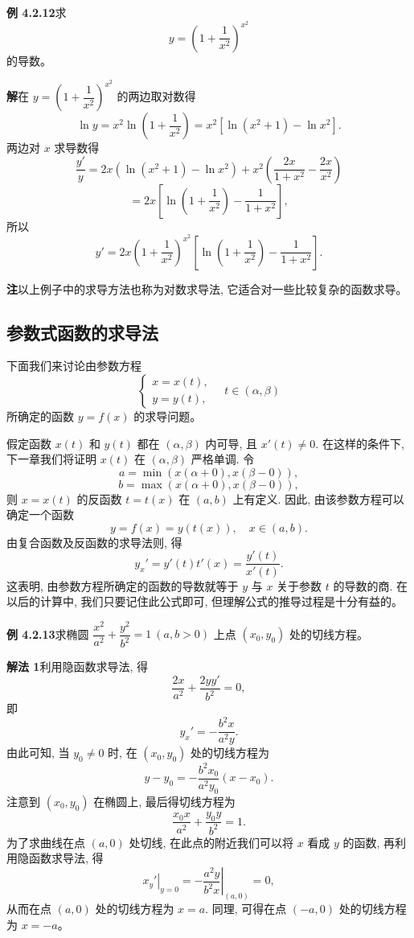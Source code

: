 \documentclass[UTF8, 12pt, fontset=fandol, oneside]{ctexart}
\begin{document}
\noindent\textbf{例 4.2.12}\quad 求
\[
  y=\left(1+\frac1{x^2}\right)^{x^2}
\]
的导数。

\noindent\textbf{解}\quad 在 $y=\left(1+\dfrac1{x^2}\right)^{x^2}$ 的两边取对数得
\[
  \ln y=x^2\ln\left(1+\frac1{x^2}\right)
  =
  x^2[\ln(x^2+1)-\ln x^2].
\]
两边对 $x$ 求导数得
\[
  \frac{y'}y
  =
  2x(\ln(x^2+1)-\ln x^2)
  +
  x^2\left(\frac{2x}{1+x^2}-\frac{2x}{x^2}\right)
\]
\[
  =
  2x\left[\ln\left(1+\frac1{x^2}\right)-\frac1{1+x^2}\right],
\]
所以
\[
  y'=2x\left(1+\frac1{x^2}\right)^{x^2}
  \left[\ln\left(1+\frac1{x^2}\right)-\frac1{1+x^2}\right].
\]

\noindent\textbf{注}\quad 以上例子中的求导方法也称为对数求导法, 它适合对一些比较复杂的函数求导。

\subsection{参数式函数的求导法}

下面我们来讨论由参数方程
\[
  \begin{cases}
    x=x(t),\\
    y=y(t),
  \end{cases}
  \quad t\in(\alpha,\beta)
\]
所确定的函数 $y=f(x)$ 的求导问题。

假定函数 $x(t)$ 和 $y(t)$ 都在 $(\alpha,\beta)$ 内可导, 且 $x'(t)\ne0$. 在这样的条件下, 下一章我们将证明 $x(t)$ 在 $(\alpha,\beta)$ 严格单调. 令
\[
  a=\min(x(\alpha+0),x(\beta-0)),
\]
\[
  b=\max(x(\alpha+0),x(\beta-0)),
\]
则 $x=x(t)$ 的反函数 $t=t(x)$ 在 $(a,b)$ 上有定义. 因此, 由该参数方程可以确定一个函数
\[
  y=f(x)=y(t(x)),\quad x\in(a,b).
\]
由复合函数及反函数的求导法则, 得
\[
  y_x'=y'(t)t'(x)=\frac{y'(t)}{x'(t)}.
\]
这表明, 由参数方程所确定的函数的导数就等于 $y$ 与 $x$ 关于参数 $t$ 的导数的商. 在以后的计算中, 我们只要记住此公式即可, 但理解公式的推导过程是十分有益的。

\noindent\textbf{例 4.2.13}\quad 求椭圆 $\dfrac{x^2}{a^2}+\dfrac{y^2}{b^2}=1\ (a,b>0)$ 上点 $(x_0,y_0)$ 处的切线方程。

\noindent\textbf{解法 1}\quad 利用隐函数求导法, 得
\[
  \frac{2x}{a^2}+\frac{2yy'}{b^2}=0,
\]
即
\[
  y_x'=-\frac{b^2x}{a^2y}.
\]
由此可知, 当 $y_0\ne0$ 时, 在 $(x_0,y_0)$ 处的切线方程为
\[
  y-y_0=-\frac{b^2x_0}{a^2y_0}(x-x_0).
\]
注意到 $(x_0,y_0)$ 在椭圆上, 最后得切线方程为
\[
  \frac{x_0x}{a^2}+\frac{y_0y}{b^2}=1.
\]
为了求曲线在点 $(a,0)$ 处切线, 在此点的附近我们可以将 $x$ 看成 $y$ 的函数, 再利用隐函数求导法, 得
\[
  \left.x_y'\right|_{y=0}
  =
  -\left.\frac{a^2y}{b^2x}\right|_{(a,0)}
  =
  0,
\]
从而在点 $(a,0)$ 处的切线方程为 $x=a$. 同理, 可得在点 $(-a,0)$ 处的切线方程为 $x=-a$。
\end{document}

